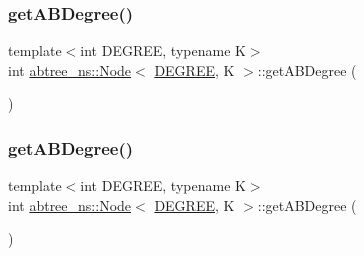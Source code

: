 \subsubsection{\texorpdfstring{get\+A\+B\+Degree()}{getABDegree()}\hspace{0.1cm}{\footnotesize\ttfamily [1/2]}}
{\footnotesize\ttfamily template$<$int D\+E\+G\+R\+EE, typename K$>$ \\
int \hyperlink{structabtree__ns_1_1Node}{abtree\+\_\+ns\+::\+Node}$<$ \hyperlink{brown__sigouin__abtree__kcas_2adapter_8h_a5d88b17d70c985f2f2b8e987037fd6dd}{D\+E\+G\+R\+EE}, K $>$\+::get\+A\+B\+Degree (\begin{DoxyParamCaption}{ }\end{DoxyParamCaption})\hspace{0.3cm}{\ttfamily [inline]}}

\mbox{\label{structabtree__ns_1_1Node_a65085f4a2fe4688479a71c50238bac69}} 
\subsubsection{\texorpdfstring{get\+A\+B\+Degree()}{getABDegree()}\hspace{0.1cm}{\footnotesize\ttfamily [2/2]}}
{\footnotesize\ttfamily template$<$int D\+E\+G\+R\+EE, typename K$>$ \\
int \hyperlink{structabtree__ns_1_1Node}{abtree\+\_\+ns\+::\+Node}$<$ \hyperlink{brown__sigouin__abtree__kcas_2adapter_8h_a5d88b17d70c985f2f2b8e987037fd6dd}{D\+E\+G\+R\+EE}, K $>$\+::get\+A\+B\+Degree (\begin{DoxyParamCaption}{ }\end{DoxyParamCaption})\hspace{0.3cm}{\ttfamily [inline]}}

\mbox{\label{structabtree__ns_1_1Node_a1229e769cf5d2e1f67405dc689e64595}} 
